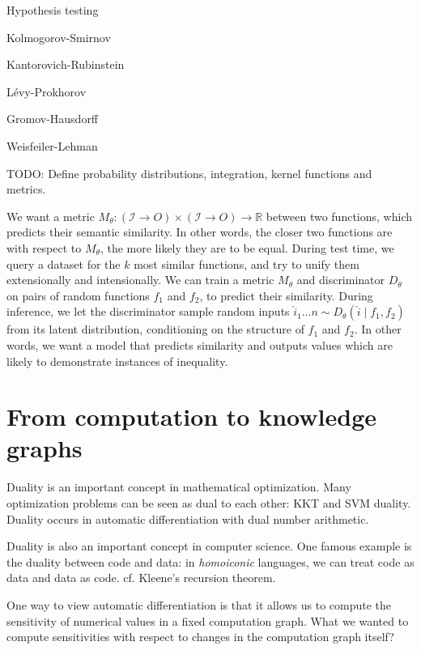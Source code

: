 \documentclass[11pt]{article}
\begin{document}
    Hypothesis testing

    Kolmogorov-Smirnov

    Kantorovich-Rubinstein

    L\'evy-Prokhorov

    Gromov-Hausdorff

    Weisfeiler-Lehman

    TODO: Define probability distributions, integration, kernel functions and metrics.

    We want a metric $M_\theta: (\mathcal{I}\rightarrow{O}) \times (\mathcal{I}\rightarrow{O})\rightarrow \mathbb{R}$ between two functions, which predicts their semantic similarity. In other words, the closer two functions are with respect to $M_\theta$, the more likely they are to be equal. During test time, we query a dataset for the $k$ most similar functions, and try to unify them extensionally and intensionally. We can train a metric $M_\theta$ and discriminator $D_\theta$ on pairs of random functions $f_1$ and $f_2$, to predict their similarity. During inference, we let the discriminator sample random inputs $\hat i_1 \ldots n \sim D_\theta(\hat i \mid f_1, f_2)$ from its latent distribution, conditioning on the structure of $f_1$ and $f_2$. In other words, we want a model that predicts similarity and outputs values which are likely to demonstrate instances of inequality.

    \pagebreak


    \section{From computation to knowledge graphs}\label{sec:graphs}


    Duality is an important concept in mathematical optimization. Many optimization problems can be seen as dual to each other: KKT and SVM duality. Duality occurs in automatic differentiation with dual number arithmetic.

    Duality is also an important concept in computer science. One famous example is the duality between code and data: in \textit{homoiconic} languages, we can treat code as data and data as code. cf. Kleene's recursion theorem.

    One way to view automatic differentiation is that it allows us to compute the sensitivity of numerical values in a fixed computation graph. What we wanted to compute sensitivities with respect to changes in the computation graph itself?
\end{document}
